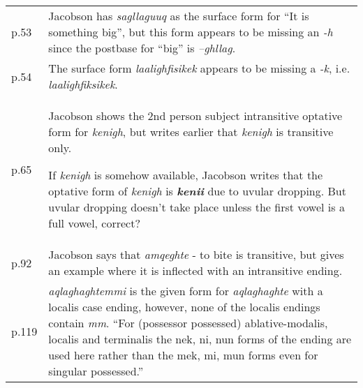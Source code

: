 \documentclass{article}
\begin{document}
\begin{tabular}{p{1cm}p{10.5cm}}
p.53 & Jacobson has \textit{sagllaguuq} as the surface form for ``It is something big'', but this form appears to be missing an \textit{-h} since the postbase for ``big'' is \textit{--ghllag}. \\

p.54 & The surface form \textit{laalighfisikek} appears to be missing a \textit{-k}, i.e. \textit{laalighfiksikek}. \\

p.65 & 	Jacobson shows the 2nd person subject intransitive optative form for \textit{kenigh}, but writes earlier that \textit{kenigh} is transitive only.

If \textit{kenigh} is somehow available, Jacobson writes that the optative form of \textit{kenigh} is \textit{\textbf{kenii}} due to uvular dropping.
%
But uvular dropping doesn't take place unless the first vowel is a full vowel, correct? \\

p.92 & Jacobson says that \textit{amqeghte} - to bite is transitive, but gives an example where it is inflected with an intransitive ending. \\

p.119 & \textit{aqlaghaghtemmi} is the given form for \textit{aqlaghaghte} with a localis case ending, however, none of the localis endings contain \textit{mm}.
%
``For (possessor possessed) ablative-modalis, localis and terminalis the nek, ni, nun forms of the ending are used here rather than the mek, mi, mun forms even for singular possessed.''

\end{tabular}


\end{document}
